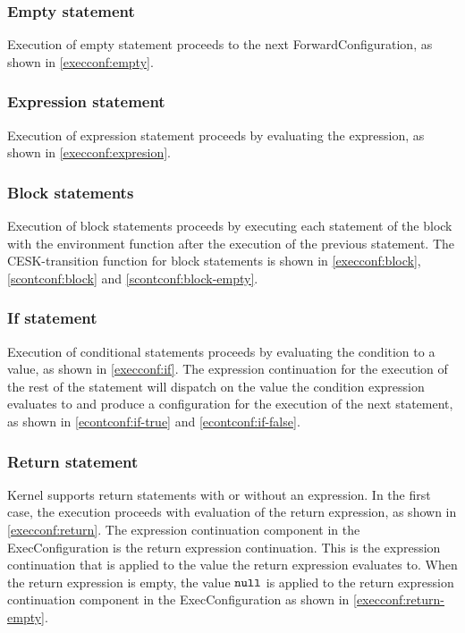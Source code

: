 \documentclass[a4paper,oneside]{article}
\begin{document}
\subsubsection{Empty statement}
\label{subsubsec:emtpy-stmt}

Execution of empty statement proceeds to the next ForwardConfiguration, as shown in \eqref{execconf:empty}.


\subsubsection{Expression statement}
\label{expression-stmt}

Execution of expression statement proceeds by evaluating the expression, as shown in \eqref{execconf:expresion}.


\subsubsection{Block statements}

Execution of block statements proceeds by executing each statement of the block with the environment function after the execution of the previous statement.
The CESK-transition function for block statements is shown in \eqref{execconf:block}, \eqref{scontconf:block} and \eqref{scontconf:block-empty}.


\subsubsection{If statement}

Execution of conditional statements proceeds by evaluating the condition to a value, as shown in \eqref{execconf:if}.
The expression continuation for the execution of the rest of the statement will dispatch on the value the condition expression evaluates to and produce a configuration for the execution of the next statement, as shown in \eqref{econtconf:if-true} and \eqref{econtconf:if-false}.


\subsubsection{Return statement}

Kernel supports return statements with or without an expression.
In the first case, the execution proceeds with evaluation of the return expression, as shown in \eqref{execconf:return}.
The expression continuation component in the ExecConfiguration is the return expression continuation.
This is the expression continuation that is applied to the value the return expression evaluates to.
When the return expression is empty, the value $\tt{null}$ is applied to the return expression continuation component in the ExecConfiguration as shown in \eqref{execconf:return-empty}.
\end{document}
